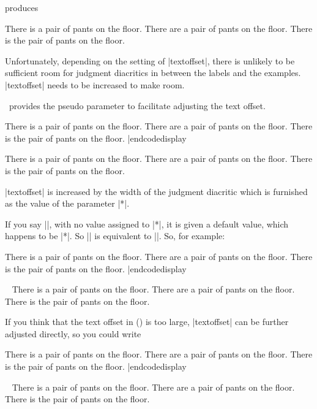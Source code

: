 \noindent produces

\framedisplay
\pex
\a There is a pair of pants on the floor.
\a {}There are a pair of pants on the floor.
\a \ljudge*There is the pair of pants on the floor.
\xe
\endframedisplay

\noindent Unfortunately, depending on the setting of
|textoffset|, there is unlikely to be sufficient room for
judgment diacritics in between the labels and the examples.
|textoffset| needs to be increased to make room.

\ExPex\ provides the pseudo parameter to
facilitate adjusting the text offset.

\codedisplay
\pex[*=?*]
\a There is a pair of pants on the floor.
\a {}There are a pair of pants on the floor.
\a \ljudge*There is the pair of pants on the floor.
\xe |endcodedisplay

\framedisplay
\pex[*=?*]
\a There is a pair of pants on the floor.
\a {}There are a pair of pants on the floor.
\a \ljudge*There is the pair of pants on the floor.
\xe
\endframedisplay

\noindent |textoffset| is increased by the width of the judgment
diacritic which is furnished as the value of the parameter |*|.

If you say |\lingset{*}|, with no value assigned to |*|, it is
given a default value, which happens to be |*|.  So |\lingset{*}|
is equivalent to |\lingset{*=*}|.  So, for example:

\codedisplay
\pex[*]
\a There is a pair of pants on the floor.
\a \ljudge* There are a pair of pants on the floor.
\a \ljudge* There is the pair of pants on the floor.
\xe |endcodedisplay

\framedisplay~
\pex[*]
\a There is a pair of pants on the floor.
\a \ljudge* There are a pair of pants on the floor.
\a \ljudge* There is the pair of pants on the floor.
\xe
\endframedisplay

If you think that the text offset in (\blastx) is too large,
|textoffset| can be further adjusted directly, so you could write

\codedisplay
\pex[*=?*,textoffset=!-.3em]
\a There is a pair of pants on the floor.
\a {} There are a pair of pants on the floor.
\a \ljudge* There is the pair of pants on the floor.
\xe |endcodedisplay

\framedisplay~
\pex[*=?*,textoffset=!-.3em]
\a There is a pair of pants on the floor.
\a {} There are a pair of pants on the floor.
\a \ljudge* There is the pair of pants on the floor.
\xe
\endframedisplay


